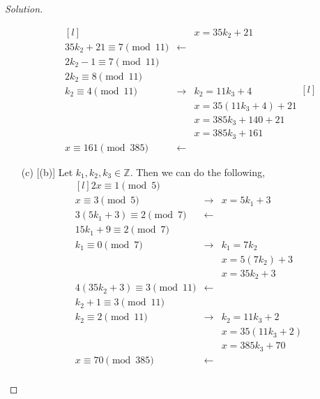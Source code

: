 \documentclass[11pt]{article}
\newcommand{\Z}{\mathbb{Z}}
\newenvironment{solution}
  {\renewcommand\qedsymbol{$~$}\begin{proof}[Solution]$ $\par\nobreak\ignorespaces}
  {\end{proof}}
\begin{document}
\begin{solution}
\begin{itemize}
\[\begin{matrix*}[l]
              &             & x= 35k_2 + 21         \\
              35k_2 + 21 \equiv 7 \pmod{11} & \leftarrow  &                       \\
              2k_2 - 1 \equiv 7 \pmod{11}   &             &                       \\
              2k_2 \equiv 8 \pmod{11}       &             &                       \\
              k_2 \equiv 4 \pmod{11}        & \rightarrow & k_2 = 11k_3 + 4       \\
              &             & x= 35(11k_3 + 4) + 21 \\
              &             & x= 385k_3 + 140 + 21  \\
              &             & x= 385k_3 + 161       \\
              x \equiv 161 \pmod{385}       & \leftarrow  &
            \end{matrix*}[l]
          \]
    \item [(c)] [(b)] Let $k_1, k_2, k_3 \in \Z$. Then we can do the following,
          \[
            \begin{matrix*}[l]
              2x \equiv 1 \pmod{5}          &             &                 \\
              x \equiv 3 \pmod{5}           & \rightarrow & x= 5k_1 + 3     \\
              3(5k_1 + 3) \equiv 2 \pmod{7} & \leftarrow  &                 \\
              15k_1 + 9 \equiv 2 \pmod{7}   &             &                 \\
              k_1 \equiv 0 \pmod{7}         & \rightarrow & k_1 = 7k_2      \\
              &             & x= 5(7k_2) +3   \\
              &             & x= 35k_2 + 3    \\
              4(35k_2+3) \equiv 3 \pmod{11} & \leftarrow  &                 \\
              k_2 + 1 \equiv 3 \pmod{11}    &             &                 \\
              k_2 \equiv 2 \pmod{11}        & \rightarrow & k_2 = 11k_3 + 2 \\
              &             & x= 35(11k_3+2)  \\
              &             & x= 385k_3 + 70  \\
              x\equiv 70 \pmod{385}         & \leftarrow  &                 \\
            \end{matrix*}
          \]
  \end{itemize}
\end{solution}
\end{document}

